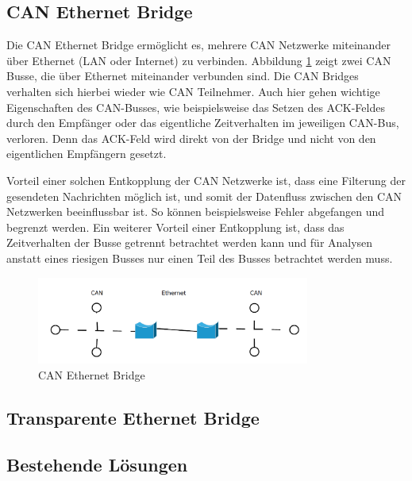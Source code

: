 \subsection{CAN Ethernet Bridge}

Die CAN Ethernet Bridge ermöglicht es, mehrere CAN Netzwerke miteinander über Ethernet (LAN oder Internet) zu verbinden. Abbildung \ref{bridge} zeigt zwei CAN Busse, die über Ethernet miteinander verbunden sind. Die CAN Bridges verhalten sich hierbei wieder wie CAN Teilnehmer. Auch hier gehen wichtige Eigenschaften des CAN-Busses, wie beispielsweise das Setzen des ACK-Feldes durch den Empfänger oder das eigentliche Zeitverhalten im jeweiligen CAN-Bus, verloren. Denn das ACK-Feld wird direkt von der Bridge und nicht von den eigentlichen Empfängern gesetzt.

Vorteil einer solchen Entkopplung der CAN Netzwerke ist, dass eine Filterung der gesendeten Nachrichten möglich ist, und somit der Datenfluss zwischen den CAN Netzwerken beeinflussbar ist. So können beispielsweise Fehler abgefangen und begrenzt werden. Ein weiterer Vorteil einer Entkopplung ist, dass das Zeitverhalten der Busse getrennt betrachtet werden kann und für Analysen anstatt eines riesigen Busses nur einen Teil des Busses betrachtet werden muss.

\begin{figure}[h] 
\centering
\includegraphics[width=0.8\textwidth]{figures/can_bridge}
\caption{CAN Ethernet Bridge} 
\label{bridge}
\end{figure} 

\subsection{Transparente Ethernet Bridge}
	
\subsection{Bestehende Lösungen}



\newpage {} \listoffigures

\newpage {}
% 



